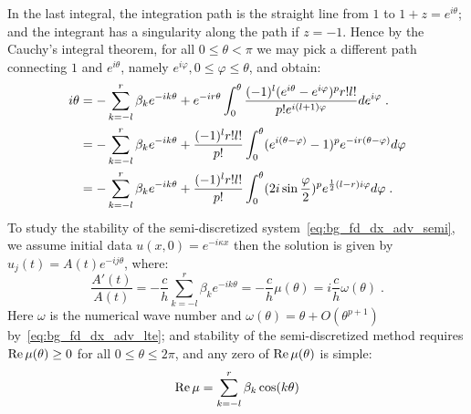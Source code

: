 In the last integral, the integration path is the straight line from $1$ to $1+z=e^{i\theta}$; and the integrant has a singularity along the path if $z=-1$.
Hence by the Cauchy's integral theorem, for all $0\le\theta<\pi$ we may pick a different path connecting $1$ and $e^{i\theta}$, namely $e^{i\varphi}, 0\le\varphi\le\theta$, and obtain:
\begin{align}
  \notag
  i\theta &= -\sum_{k=-l}^r\beta_ke^{-ik\theta}+e^{-ir\theta}\int_0^{\theta}\frac{(-1)^l(e^{i\theta}-e^{i\varphi})^pr!l!}{p!e^{i(l+1)\varphi}}de^{i\varphi}\;. \\
  \notag
  &= -\sum_{k=-l}^r\beta_ke^{-ik\theta}+\frac{(-1)^lr!l!}{p!}\int_0^{\theta}(e^{i(\theta-\varphi)}-1)^pe^{-ir(\theta-\varphi)}d\varphi \\
  \label{eq:bg_fd_dx_adv_semi_symbol}
  &= -\sum_{k=-l}^r\beta_ke^{-ik\theta}+\frac{(-1)^lr!l!}{p!}\int_0^{\theta}(2i\sin\frac{\varphi}{2})^pe^{\frac{1}{2}(l-r)i\varphi}d\varphi\;.
\end{align}
To study the stability of the semi-discretized system~\cref{eq:bg_fd_dx_adv_semi}, we assume initial data $u(x,0)=e^{-i\kappa x}$ then the solution is given by $u_j(t)=A(t)e^{-ij\theta}$, where:
\begin{displaymath}
  \frac{A'(t)}{A(t)} = -\frac{c}{h}\sum_{k=-l}^r\beta_ke^{-ik\theta} = -\frac{c}{h}\mu(\theta) = i\frac{c}{h}\omega(\theta)\;.
\end{displaymath}
Here $\omega$ is the numerical wave number and $\omega(\theta)=\theta+O(\theta^{p+1})$ by~\cref{eq:bg_fd_dx_adv_lte}; and stability of the semi-discretized method requires $\operatorname{Re}\mu(\theta)\ge 0$ for all $0\le \theta\le 2\pi$, and any zero of $\operatorname{Re}\mu(\theta)$ is simple:
\begin{equation}\label{eq:bg_fd_dx_adv_re}
  \operatorname{Re}\mu = \sum_{k=-l}^r\beta_k\cos(k\theta)
\end{equation}


